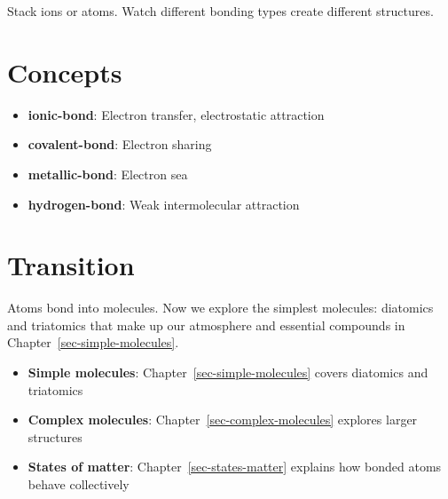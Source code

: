 \documentclass[
  11pt,
  letterpaper,
  twoside,
  openright]{book}
\providecommand{\tightlist}{%
  \setlength{\itemsep}{0pt}\setlength{\parskip}{0pt}}
\begin{document}
Stack ions or atoms. Watch different bonding types create different
structures.

\section{Concepts}\label{concepts-4}

\begin{itemize}
\tightlist
\item
  \textbf{ionic-bond}: Electron transfer, electrostatic attraction
\item
  \textbf{covalent-bond}: Electron sharing
\item
  \textbf{metallic-bond}: Electron sea
\item
  \textbf{hydrogen-bond}: Weak intermolecular attraction
\end{itemize}

\section{Transition}\label{transition-4}

Atoms bond into molecules. Now we explore the simplest molecules:
diatomics and triatomics that make up our atmosphere and essential
compounds in Chapter~\ref{sec-simple-molecules}.

\begin{tcolorbox}[enhanced jigsaw, leftrule=.75mm, title=\textcolor{quarto-callout-tip-color}{\faLightbulb}\hspace{0.5em}{Related Topics}, bottomrule=.15mm, opacityback=0, coltitle=black, arc=.35mm, colframe=quarto-callout-tip-color-frame, colbacktitle=quarto-callout-tip-color!10!white, colback=white, titlerule=0mm, breakable, bottomtitle=1mm, toptitle=1mm, rightrule=.15mm, toprule=.15mm, left=2mm, opacitybacktitle=0.6]

\begin{itemize}
\tightlist
\item
  \textbf{Simple molecules}: Chapter~\ref{sec-simple-molecules} covers
  diatomics and triatomics
\item
  \textbf{Complex molecules}: Chapter~\ref{sec-complex-molecules}
  explores larger structures
\item
  \textbf{States of matter}: Chapter~\ref{sec-states-matter} explains
  how bonded atoms behave collectively
\end{itemize}

\end{tcolorbox}
\end{document}

